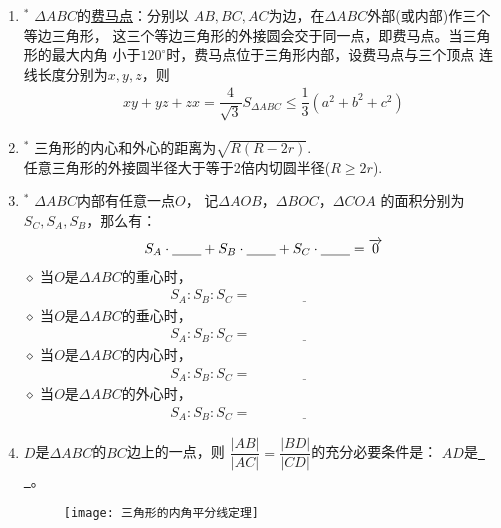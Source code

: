\documentclass{article}
\newif\ifte
\renewcommand{\vec}{\overrightarrow}
\renewcommand\leq\leqslant
\renewcommand\geq\geqslant
\begin{document}
\begin{multicols}{2}
\begin{enumerate}[leftmargin=20pt]
\item $^*$ $ \Delta ABC $的\underline{费马点}：分别以
$ AB,BC,AC $为边，在$ \Delta ABC $外部(或内部)作三个等边三角形，
这三个等边三角形的外接圆会交于同一点，即费马点。当三角形的最大内角
小于$ 120^{\circ} $时，费马点位于三角形内部，设费马点与三个顶点
连线长度分别为$ x,y,z $，则
\begin{gather*}
    xy+yz+zx=\dfrac{4}{\sqrt{3}}S_{\Delta ABC}\leq 
    \dfrac{1}{3}(a^2+b^2+c^2)
\end{gather*}

\item $^*$ 三角形的内心和外心的距离为$ \sqrt{R(R-2r)} $.\\
任意三角形的外接圆半径大于等于2倍内切圆半径($ R\geq2r $).

\item $^*$ $ \Delta ABC $内部有任意一点$ O $，
记$ \Delta AOB $，$ \Delta BOC $，$ \Delta COA $
的面积分别为$ S_C,S_A,S_B $，那么有：
\begin{align*}
    S_A\cdot \underline{\ \ifte \vec{OA}
        \else \hspace{0.5cm} \fi\ }+ 
    S_B\cdot \underline{\ \ifte \vec{OB}
        \else \hspace{0.5cm} \fi\ }+
    S_C\cdot \underline{\ \ifte \vec{OC}
        \else \hspace{0.5cm} \fi\ }= \vec{0}
\end{align*}
$\diamond$ 当$ O $是$ \Delta ABC $的重心时，
\begin{gather*}
    S_A:S_B:S_C=\underline{\ \ifte 1:1:1
        \else \hspace{3cm} \fi\ }
\end{gather*}
$\diamond$ 当$ O $是$ \Delta ABC $的垂心时，
\begin{gather*}
    S_A:S_B:S_C=\underline{\ \ifte \tan A:
    \tan B:\tan C\else \hspace{3cm} \fi\ } 
\end{gather*}
$\diamond$ 当$ O $是$ \Delta ABC $的内心时，
\begin{gather*}
    S_A:S_B:S_C=\underline{\ \ifte a:b:c
        \else \hspace{3cm} \fi\ }
\end{gather*}
$\diamond$ 当$ O $是$ \Delta ABC $的外心时，
\begin{gather*}
    S_A:S_B:S_C=\underline{\ \ifte 
        \sin 2A:\sin 2B:\sin 2C
        \else \hspace{3cm} \fi\ }
\end{gather*}

\item $ D $是$ \Delta ABC $的$ BC $边上的一点，则
$ \dfrac{|AB|}{|AC|}=\dfrac{|BD|}{|CD|} $的充分必要条件是：
$ AD $是\underline{\ \ifte $ \angle BAC $的角平分线
    \else \hspace{4cm} \fi\ }。
\begin{figure}[H]
    \centering
    \texttt{[image: 三角形的内角平分线定理]}
\end{figure}



\end{enumerate}
\end{multicols}
\end{document}

